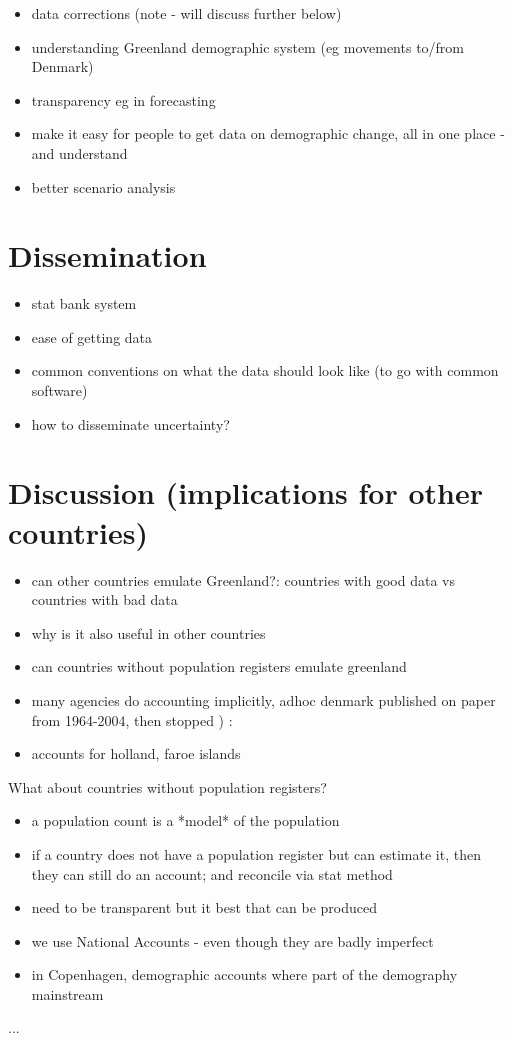 \documentclass[USenglish]{article}
\begin{document}
\begin{itemize}
    \item data corrections (note - will discuss further below)
    \item understanding Greenland demographic system (eg movements to/from Denmark)
    \item transparency eg in forecasting
    \item make it easy for people to get data on demographic change, all in one place - and understand
    \item better scenario analysis
\end{itemize}



\section{Dissemination}

\begin{itemize}
    \item stat bank system
    \item ease of getting data
    \item common conventions on what the data should look like (to go with common software)
    \item how to disseminate uncertainty?
\end{itemize}

\section{Discussion (implications for other countries)}

\begin{itemize}
    \item can other countries emulate Greenland?: countries with good data vs countries with bad data
    \item why is it also useful in other countries
    \item can countries without population registers emulate greenland
    \item many agencies do accounting implicitly, adhoc
    denmark published on paper from 1964-2004, then stopped ) :
    \item accounts for holland, faroe islands
    
\end{itemize}

What about countries without population registers?
\begin{itemize}
    \item a population count is a *model* of the population
    \item if a country does not have a population register but can estimate it, then they can still do an account; and reconcile via stat method
    \item need to be transparent but it best that can be produced
    \item we use National Accounts - even though they are badly imperfect
    \item in Copenhagen, demographic accounts where part of the demography mainstream
\end{itemize}


\begin{acknowledgement}
  ...
\end{acknowledgement}

%
%
\end{document}
